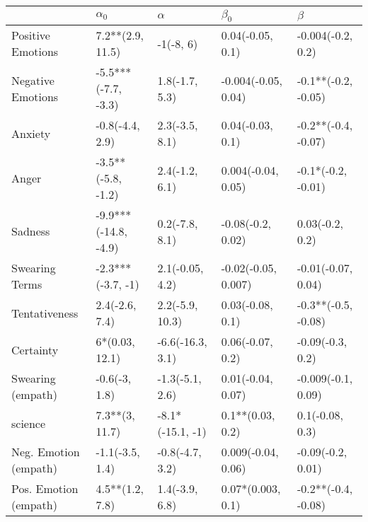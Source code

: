 \begin{tabular}{lllll}
\toprule
{} &            $\alpha_0$ &          $\alpha$ &            $\beta_0$ &              $\beta$ \\
\midrule
Positive Emotions     &      7.2**(2.9, 11.5) &         -1(-8, 6) &     0.04(-0.05, 0.1) &    -0.004(-0.2, 0.2) \\
Negative Emotions     &   -5.5***(-7.7, -3.3) &    1.8(-1.7, 5.3) &  -0.004(-0.05, 0.04) &  -0.1**(-0.2, -0.05) \\
Anxiety               &       -0.8(-4.4, 2.9) &    2.3(-3.5, 8.1) &     0.04(-0.03, 0.1) &  -0.2**(-0.4, -0.07) \\
Anger                 &    -3.5**(-5.8, -1.2) &    2.4(-1.2, 6.1) &   0.004(-0.04, 0.05) &   -0.1*(-0.2, -0.01) \\
Sadness               &  -9.9***(-14.8, -4.9) &    0.2(-7.8, 8.1) &    -0.08(-0.2, 0.02) &      0.03(-0.2, 0.2) \\
Swearing Terms        &     -2.3***(-3.7, -1) &   2.1(-0.05, 4.2) &  -0.02(-0.05, 0.007) &   -0.01(-0.07, 0.04) \\
Tentativeness         &        2.4(-2.6, 7.4) &   2.2(-5.9, 10.3) &     0.03(-0.08, 0.1) &  -0.3**(-0.5, -0.08) \\
Certainty             &        6*(0.03, 12.1) &  -6.6(-16.3, 3.1) &     0.06(-0.07, 0.2) &     -0.09(-0.3, 0.2) \\
Swearing (empath)     &         -0.6(-3, 1.8) &   -1.3(-5.1, 2.6) &    0.01(-0.04, 0.07) &   -0.009(-0.1, 0.09) \\
science               &        7.3**(3, 11.7) &  -8.1*(-15.1, -1) &     0.1**(0.03, 0.2) &      0.1(-0.08, 0.3) \\
Neg. Emotion (empath) &       -1.1(-3.5, 1.4) &   -0.8(-4.7, 3.2) &   0.009(-0.04, 0.06) &    -0.09(-0.2, 0.01) \\
Pos. Emotion (empath) &       4.5**(1.2, 7.8) &    1.4(-3.9, 6.8) &    0.07*(0.003, 0.1) &  -0.2**(-0.4, -0.08) \\
\bottomrule
\end{tabular}
